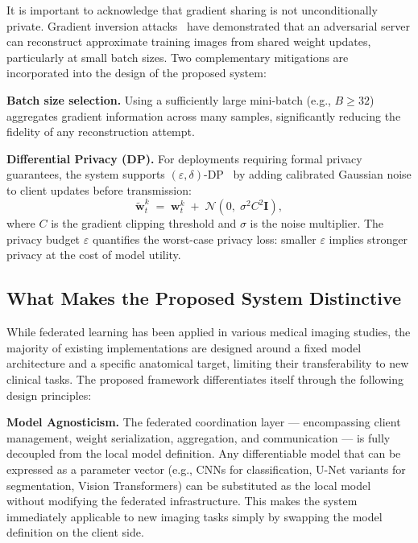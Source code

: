 It is important to acknowledge that gradient sharing is not unconditionally
private. Gradient inversion attacks~\cite{zhu2019} have demonstrated that
an adversarial server can reconstruct approximate training images from shared
weight updates, particularly at small batch sizes. Two complementary
mitigations are incorporated into the design of the proposed system:
 
\textbf{Batch size selection.} Using a sufficiently large mini-batch (e.g.,
$B \geq 32$) aggregates gradient information across many samples, significantly
reducing the fidelity of any reconstruction attempt.
 
\textbf{Differential Privacy (DP).} For deployments requiring formal privacy
guarantees, the system supports $(\varepsilon, \delta)$-DP~\cite{dwork2014}
by adding calibrated Gaussian noise to client updates before transmission:
\begin{equation}
    \tilde{\mathbf{w}}_t^k \;=\; \mathbf{w}_t^k \;+\;
    \mathcal{N}\!\left(0,\;\sigma^2 C^2 \mathbf{I}\right),
\end{equation}
where $C$ is the gradient clipping threshold and $\sigma$ is the noise
multiplier. The privacy budget $\varepsilon$ quantifies the worst-case
privacy loss: smaller $\varepsilon$ implies stronger privacy at the cost
of model utility.
 
\subsection{What Makes the Proposed System Distinctive}
\label{subsec:fl_novelty}
 
While federated learning has been applied in various medical imaging studies,
the majority of existing implementations are designed around a fixed model
architecture and a specific anatomical target, limiting their transferability
to new clinical tasks. The proposed framework differentiates itself through
the following design principles:
 
\textbf{Model Agnosticism.} The federated coordination layer — encompassing
client management, weight serialization, aggregation, and communication — is
fully decoupled from the local model definition. Any differentiable model
that can be expressed as a parameter vector (e.g., CNNs for classification,
U-Net variants for segmentation, Vision Transformers) can be substituted as
the local model without modifying the federated infrastructure. This makes
the system immediately applicable to new imaging tasks simply by swapping the
model definition on the client side.
 
